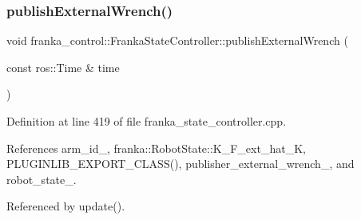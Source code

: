\mbox{\label{classfranka__control_1_1FrankaStateController_a16421a8f95eb59bb9e94e4f011e33cb2}} 
\subsubsection{\texorpdfstring{publish\+External\+Wrench()}{publishExternalWrench()}}
{\footnotesize\ttfamily void franka\+\_\+control\+::\+Franka\+State\+Controller\+::publish\+External\+Wrench (\begin{DoxyParamCaption}\item[{const ros\+::\+Time \&}]{time }\end{DoxyParamCaption})\hspace{0.3cm}{\ttfamily [private]}}



Definition at line 419 of file franka\+\_\+state\+\_\+controller.\+cpp.



References arm\+\_\+id\+\_\+, franka\+::\+Robot\+State\+::\+K\+\_\+\+F\+\_\+ext\+\_\+hat\+\_\+K, P\+L\+U\+G\+I\+N\+L\+I\+B\+\_\+\+E\+X\+P\+O\+R\+T\+\_\+\+C\+L\+A\+S\+S(), publisher\+\_\+external\+\_\+wrench\+\_\+, and robot\+\_\+state\+\_\+.



Referenced by update().


